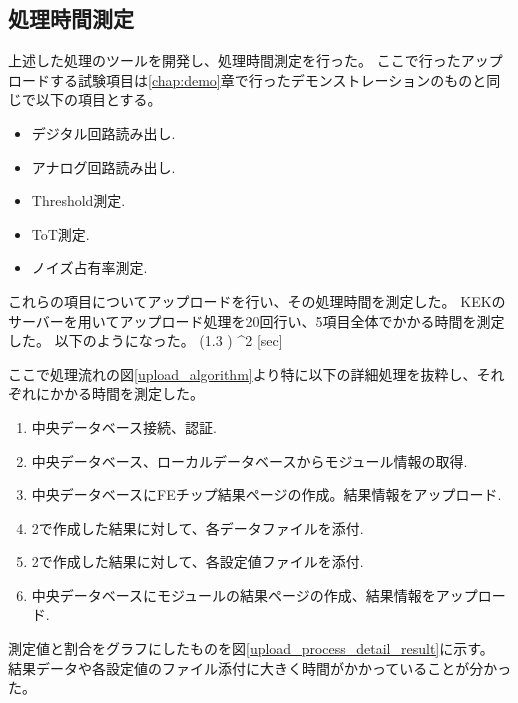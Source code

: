 \subsection{処理時間測定}
上述した処理のツールを開発し、処理時間測定を行った。
ここで行ったアップロードする試験項目は\ref{chap:demo}章で行ったデモンストレーションのものと同じで以下の項目とする。
\begin{itemize}
  \item デジタル回路読み出し.
  \item アナログ回路読み出し.
  \item Threshold測定.
  \item ToT測定.
  \item ノイズ占有率測定.
\end{itemize}

これらの項目についてアップロードを行い、その処理時間を測定した。
KEKのサーバーを用いてアップロード処理を20回行い、5項目全体でかかる時間を測定した。
以下のようになった。
\bbb
  \label{func:upload_time_before}
  (1.3 ) ^2 [{\rm sec}]
\eee

ここで処理流れの図\ref{upload_algorithm}より特に以下の詳細処理を抜粋し、それぞれにかかる時間を測定した。

\begin{enumerate}
  \item 中央データベース接続、認証.
  \item 中央データベース、ローカルデータベースからモジュール情報の取得.
  \item 中央データベースにFEチップ結果ページの作成。結果情報をアップロード.
  \item 2で作成した結果に対して、各データファイルを添付.
  \item 2で作成した結果に対して、各設定値ファイルを添付.
  \item 中央データベースにモジュールの結果ページの作成、結果情報をアップロード.
\end{enumerate}

測定値と割合をグラフにしたものを図\ref{upload_process_detail_result}に示す。
結果データや各設定値のファイル添付に大きく時間がかかっていることが分かった。

